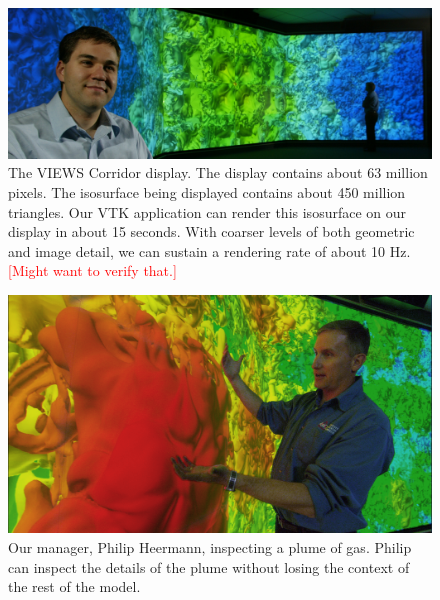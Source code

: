 \documentclass[twocolumn]{article}
\newcommand{\sticky}[1]{\textcolor{Red}{[#1]}}
\begin{document}
  \begin{figure}[!p]
    \includegraphics[width=\textwidth]{images/FullWall}
    \caption{The VIEWS Corridor display.  The display contains about 63
    million pixels.  The isosurface being displayed contains about 450
    million triangles.  Our VTK application can render this isosurface on
    our display in about 15 seconds.  With coarser levels of both geometric
    and image detail, we can sustain a rendering rate of about 10 Hz.
    \sticky{Might want to verify that.}}
    \label{fig:fullwall}
  \end{figure}

  \begin{figure}[!p]
    \includegraphics[width=\textwidth]{images/PhilwBlob}
    \caption{Our manager, Philip Heermann, inspecting a plume of gas.
    Philip can inspect the details of the plume without losing the context
    of the rest of the model.}
    \label{fig:philwblob}
  \end{figure}
\end{document}
